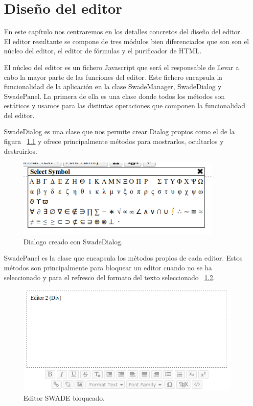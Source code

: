 \chapter{Diseño del editor}

En este capítulo nos centraremos en los detalles concretos del diseño del editor. El editor resultante se compone de tres módulos bien diferenciados que son son el núcleo del editor, el editor de fórmulas y el purificador de HTML.

El núcleo del editor es un fichero Javascript que será el responsable de llevar a cabo la mayor parte de las funciones del editor. Este fichero encapsula la funcionalidad de la aplicación en la clase SwadeManager, SwadeDialog y SwadePanel. La primera de ella es una clase donde todos los métodos son estáticos y usamos para las distintas operaciones que componen la funcionalidad del editor. 

SwadeDialog es una clase que nos permite crear Dialog propios como el de la figura ~\ref{fig:dialog} y ofrece principalmente métodos para mostrarlos, ocultarlos y destruirlos.


\begin{figure}[h!]
  \centering
      \includegraphics[width=4in]{fig/dialog}
  \caption{Dialogo creado con SwadeDialog.}
  \label{fig:dialog}

\end{figure}


SwadePanel es la clase que encapsula los métodos propios de cada editor. Estos métodos son principalmente para bloquear un editor cuando no se ha seleccionado y para el refresco del formato del texto seleccionado ~\ref{fig:panel}.

\begin{figure}[h!]
  \centering
      \includegraphics[width=7in]{fig/panel}
  \caption{Editor SWADE bloqueado.}
  \label{fig:panel}

\end{figure}


